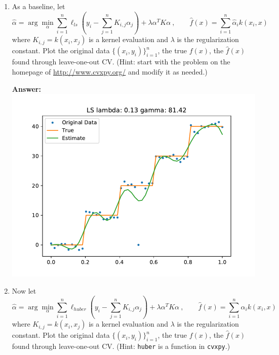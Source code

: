 \documentclass{article}
\newcommand{\1}{\mathbf{1}}
\begin{document}
\begin{enumerate}
  \item As a baseline, let
\[
  \widehat{\alpha} = \arg\min_\alpha \sum_{i=1}^n \ell_{ls}(y_i - \sum_{j=1}^n K_{i,j} \alpha_j) + \lambda \alpha^T K \alpha \ , \quad \quad \widehat{f}(x)=\sum_{i=1}^n \widehat{\alpha}_i k(x_i,x) 
\]
where $K_{i,j} = k(x_i,x_j)$ is a kernel evaluation and $\lambda$ is the regularization constant.
Plot the original data $\{(x_i,y_i)\}_{i=1}^n$, the true $f(x)$, the $\widehat{f}(x)$ found through leave-one-out CV.
(Hint: start with the problem on the homepage of \url{http://www.cvxpy.org/} and modify it as needed.)

\textbf{Answer:}\\
\includegraphics{2_ls.pdf}

\item Now let
\[
  \widehat{\alpha} = \arg\min_\alpha \sum_{i=1}^n \ell_{huber}(y_i - \sum_{j=1}^n K_{i,j} \alpha_j) + \lambda \alpha^T K \alpha \ , \quad \quad \widehat{f}(x)=\sum_{i=1}^n \widehat{\alpha}_i k(x_i,x) 
\]
where $K_{i,j} = k(x_i,x_j)$ is a kernel evaluation and $\lambda$ is the regularization constant.
Plot the original data $\{(x_i,y_i)\}_{i=1}^n$, the true $f(x)$, the $\widehat{f}(x)$ found through leave-one-out CV.
(Hint: \texttt{huber} is a function in \texttt{cvxpy}.)


\end{enumerate}
\end{document}
